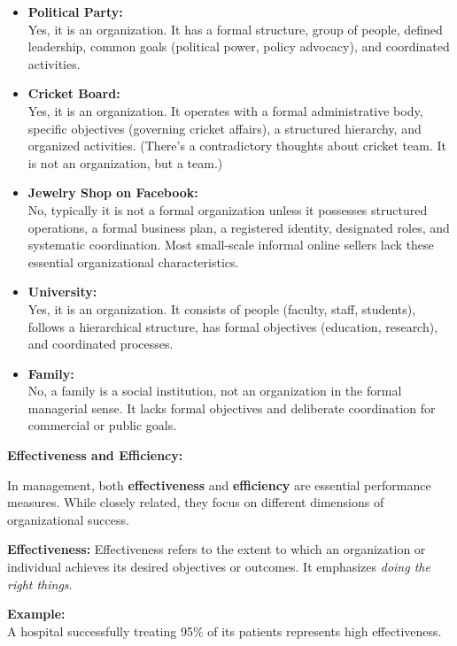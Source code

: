 \documentclass[12pt,a4paper]{book}
\begin{document}
\begin{itemize}
    \item \textbf{Political Party:} \\
    Yes, it is an organization. It has a formal structure, group of people, defined leadership, common goals (political power, policy advocacy), and coordinated activities.
    
    \item \textbf{Cricket Board:} \\
    Yes, it is an organization. It operates with a formal administrative body, specific objectives (governing cricket affairs), a structured hierarchy, and organized activities. (There's a contradictory thoughts about cricket team. It is not an organization, but a team.) 

    \item \textbf{Jewelry Shop on Facebook:} \\
    No, typically it is not a formal organization unless it possesses structured operations, a formal business plan, a registered identity, designated roles, and systematic coordination. Most small-scale informal online sellers lack these essential organizational characteristics.
    
    \item \textbf{University:} \\
    Yes, it is an organization. It consists of people (faculty, staff, students), follows a hierarchical structure, has formal objectives (education, research), and coordinated processes.

    \item \textbf{Family:} \\
    No, a family is a social institution, not an organization in the formal managerial sense. It lacks formal objectives and deliberate coordination for commercial or public goals.
\end{itemize}


\textbf{Effectiveness and Efficiency:}

In management, both \textbf{effectiveness} and \textbf{efficiency} are essential performance measures. While closely related, they focus on different dimensions of organizational success.

\textbf{Effectiveness:}
Effectiveness refers to the extent to which an organization or individual achieves its desired objectives or outcomes. It emphasizes \textit{doing the right things}.

\textbf{Example:}\\
A hospital successfully treating 95\% of its patients represents high effectiveness.
\end{document}
